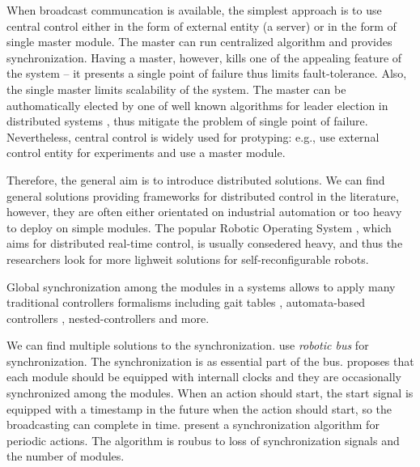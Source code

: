 \bigskip

When broadcast communcation is available, the simplest approach is to use
central control either in the form of external entity (a server) or in the form
of single master module. The master can run centralized algorithm and provides
synchronization. Having a master, however, kills one of the appealing feature of
the system -- it presents a single point of failure thus limits fault-tolerance.
Also, the single master limits scalability of the system. The master can be
authomatically elected by one of well known algorithms for leader election in
distributed systems \cite{baca2016coordination}, thus mitigate the problem of
single point of failure. Nevertheless, central control is widely used for
protyping: e.g., \cite{DBLP:journals/ijrr/KurokawaTKKHM08,
DBLP:conf/icra/TosunDJKCY18} use external control entity for experiments and
\cite{superbotroller} use a master module.

Therefore, the general aim is to introduce distributed solutions. We can find
general solutions providing frameworks for distributed control in the
literature, however, they are often either orientated on industrial automation
or too heavy to deploy on simple modules. The popular Robotic Operating System
\cite{DBLP:journals/corr/abs-1809-02595}, which aims for distributed real-time
control, is usually consedered heavy, and thus the researchers look for more
lighweit solutions for self-reconfigurable robots.

Global synchronization among the modules in a systems allows to apply many
traditional controllers formalisms including gait tables
\cite{DBLP:conf/icarcv/KurokawaKYTMK02, DBLP:conf/iros/YimSSPDT07a},
automata-based controllers \cite{DBLP:journals/procedia/PouyaAMI11,
DBLP:journals/arobots/JingTYK18}, nested-controllers \cite{1159219} and more.

We can find multiple solutions to the synchronization.
\textcite{DBLP:journals/ijrr/ParkCTY08} use \emph{robotic bus} \cite{roboticbus}
for synchronization. The synchronization is as essential part of the bus.
\textcite{yim1994locomotion} proposes that each module should be equipped with
internall clocks and they are occasionally synchronized among the modules. When
an action should start, the start signal is equipped with a timestamp in the
future when the action should start, so the broadcasting can complete in time.
\textcite{stoy2002global} present a synchronization algorithm for periodic
actions. The algorithm is roubus to loss of synchronization signals and the
number of modules.

